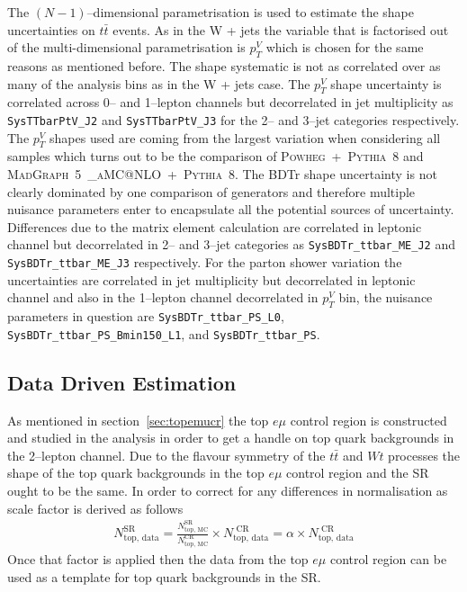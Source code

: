 The $(N-1)$--dimensional parametrisation is used to estimate the shape
uncertainties on $t\bar{t}$ events. As in the W + jets the variable that is
factorised out of the multi-dimensional parametrisation is $p_T^V$ which is
chosen for the same reasons as mentioned before. The shape systematic is not as
correlated over as many of the analysis bins as in the W + jets case. The
$p_T^V$ shape uncertainty is correlated across 0-- and 1--lepton channels but
decorrelated in jet multiplicity as \texttt{SysTTbarPtV\_J2} and
\texttt{SysTTbarPtV\_J3} for the 2-- and 3--jet categories respectively. The
$p_T^V$ shapes used are coming from the largest variation when considering all
samples which turns out to be the comparison of
\textsc{Powheg}~+~\textsc{Pythia}~8 and
\textsc{MadGraph}~5~\textsc{\_aMC@NLO}~+~\textsc{Pythia}~8. The BDTr shape
uncertainty is not clearly dominated by one comparison of generators and
therefore multiple nuisance parameters enter to encapsulate all the potential
sources of uncertainty. Differences due to the matrix element calculation are
correlated in leptonic channel but decorrelated in 2-- and 3--jet categories as
\texttt{SysBDTr\_ttbar\_ME\_J2} and \texttt{SysBDTr\_ttbar\_ME\_J3}
respectively. For the parton shower variation the uncertainties are correlated
in jet multiplicity but decorrelated in leptonic channel and also in the
1--lepton channel decorrelated in $p_T^V$ bin, the nuisance parameters in
question are \texttt{SysBDTr\_ttbar\_PS\_L0},
\texttt{SysBDTr\_ttbar\_PS\_Bmin150\_L1}, and \texttt{SysBDTr\_ttbar\_PS}.

\subsection{Data Driven Estimation}
\label{sec:ttbar_DD}

As mentioned in section~\ref{sec:topemucr} the top $e\mu$ control region is
constructed and studied in the analysis in order to get a handle on top quark
backgrounds in the 2--lepton channel. Due to the flavour symmetry of the
$t\bar{t}$ and $Wt$ processes the shape of the top quark backgrounds in the top
$e\mu$ control region and the SR ought to be the same. In order to correct for
any differences in normalisation as scale factor is derived as follows
\begin{align}
  N_{\text{top, data}}^{\text{SR}}
  =
  \frac{N_{\text{top, MC}}^{\text{SR}}}{N_{\text{top, MC}}^{\text{CR}}}
  \times
  N_{\text{top, data}}^{\text{ CR}}
  = \alpha \times N_{\text{top, data}}^{\text{ CR}}
  \label{eq:TTbar_DD_ExtrapFac}
\end{align}
Once that factor is applied then the data from the top $e\mu$ control region can
be used as a template for top quark backgrounds in the SR.

